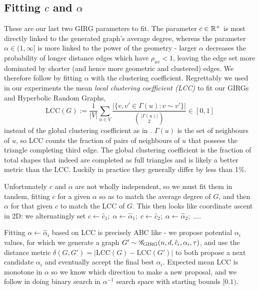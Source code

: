 \subsection{Fitting $c$ and $\alpha$}
\label{subsec:fitting_c_and_alpha}
These are our last two GIRG parameters to fit.
The parameter $c \in \mathbb{R}^+$ is most directly linked to the generated graph's average degree, whereas the parameter $\alpha \in (1, \infty]$ is more linked to the power of the geometry - larger $\alpha$ decreases the probability of longer distance edges which have $\rho_{uv} < 1$, leaving the edge set more dominated by shorter (and hence more geometric and clustered) edges. We therefore follow \cite{blasius2018towards} by fitting $\alpha$ with the clustering coefficient. Regrettably we used in our experiments the mean \textit{local clustering coefficient (LCC)} to fit our GIRGs and Hyperbolic Random Graphs, 
\begin{equation}
    \mathrm{LCC}(G) := \frac{1}{|V|} \sum_{u \in V} 
    \frac{| \{ v, v' \in \Gamma(u): v \sim v'\} |}{{|\Gamma(u)| \choose 2}} \in [0, 1]
\end{equation}
instead of the global clustering coefficient as in \cite{blasius2018towards}. $\Gamma(u)$ is the set of neighbours of $u$, so LCC counts the fraction of pairs of neighbours of $u$ that possess the triangle completing third edge. The global clustering coefficient is the fraction of total  shapes that indeed are completed as full triangles and is likely a better metric than the LCC. Luckily in practice they generally differ by less than 1\%.

Unfortunately $c$ and $\alpha$ are not wholly independent, so we must fit them in tandem, fitting $c$ for a given $\alpha$ so as to match the average degree of $G$, and then $\alpha$ for that given $c$ to match the LCC of $G$. This then looks like coordinate ascent in 2D: we alternatingly set $c \gets \hat{c}_1;\; \alpha \gets \hat{\alpha}_1;\; c \gets \hat{c}_2;\; \alpha \gets \hat{\alpha}_2;\; ...$.

Fitting $\alpha \gets \hat{\alpha}_i$ based on LCC is precisely ABC like - we propose potential $\alpha_i$ values, for which we generate a graph $G' \sim \mathscr{G}_{\mathrm{GIRG}}(n, d, \hat{c}_i, \alpha_i, \tau)$, and use the distance metric $\delta(G, G') = |\mathrm{LCC}(G) - \mathrm{LCC}(G')|$ to both propose a next candidate $\alpha_i$ and eventually accept the final best $\hat{\alpha}_i$. Expected mean LCC is monotone in $\alpha$ so we know which direction to make a new proposal, and we follow \cite{blasius2018towards} in doing binary search in $\alpha^{-1}$ search space with starting bounds $[0. 1)$.

